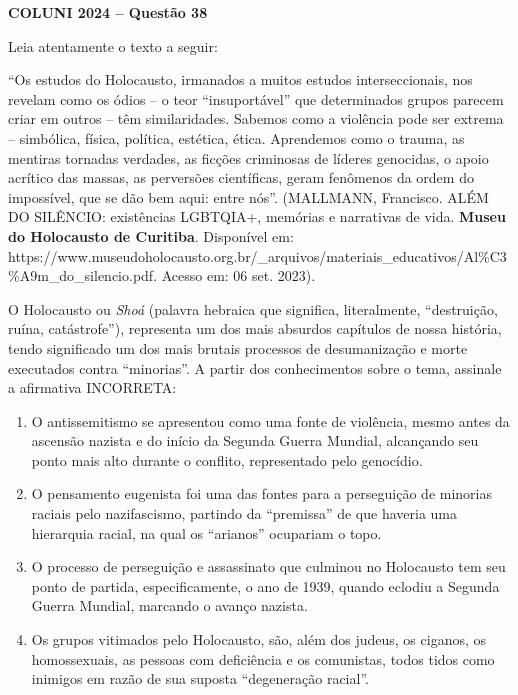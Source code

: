 \textbf{COLUNI 2024 -- Questão 38}\par\medskip Leia atentamente o texto a seguir:

\par

“Os estudos do Holocausto, irmanados a muitos estudos interseccionais, nos revelam como os ódios – o teor “insuportável” que determinados grupos parecem criar em outros – têm similaridades. Sabemos como a violência pode ser extrema – simbólica, física, política, estética, ética. Aprendemos como o trauma, as mentiras tornadas verdades, as ficções criminosas de líderes genocidas, o apoio acrítico das massas, as perversões científicas, geram fenômenos da ordem do impossível, que se dão bem aqui: entre nós”. (MALLMANN, Francisco. ALÉM DO SILÊNCIO: existências LGBTQIA+, memórias e narrativas de vida. \textbf{Museu do Holocausto de Curitiba}.       Disponível     em:      https://www.museudoholocausto.org.br/\_arquivos/materiais\_educativos/Al\%C3\%A9m\_do\_silencio.pdf. Acesso em: 06 set. 2023).

\par

O Holocausto ou \textit{Shoá} (palavra hebraica que significa, literalmente, “destruição, ruína, catástrofe”), representa um dos mais absurdos capítulos de nossa história, tendo significado um dos mais brutais processos de desumanização e morte executados contra “minorias”. A partir dos conhecimentos sobre o tema, assinale a afirmativa INCORRETA:


\begin{enumerate}
\item O antissemitismo se apresentou como uma fonte de violência, mesmo antes da ascensão nazista e do início
        da Segunda Guerra Mundial, alcançando seu ponto mais alto durante o conflito, representado pelo genocídio.
\item O pensamento eugenista foi uma das fontes para a perseguição de minorias raciais pelo nazifascismo,
        partindo da “premissa” de que haveria uma hierarquia racial, na qual os “arianos” ocupariam o topo.
\item O processo de perseguição e assassinato que culminou no Holocausto tem seu ponto de partida,
        especificamente, o ano de 1939, quando eclodiu a Segunda Guerra Mundial, marcando o avanço nazista.
\item Os grupos vitimados pelo Holocausto, são, além dos judeus, os ciganos, os homossexuais, as pessoas com
        deficiência e os comunistas, todos tidos como inimigos em razão de sua suposta “degeneração racial”.\end{enumerate}
